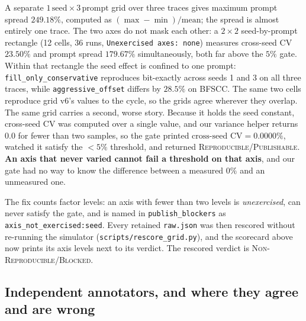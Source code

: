 \documentclass[10pt,twocolumn]{article}
\begin{document}
A separate $1\,\text{seed}\times3\,\text{prompt}$ grid over three traces gives
maximum prompt spread $\mathbf{249.18\%}$, computed as
$(\max-\min)/\text{mean}$; the
spread is almost entirely one trace. The two axes do not mask each other: a
$2\times2$ seed-by-prompt rectangle (12 cells, 36 runs, \texttt{Unexercised axes:
none}) measures cross-seed CV $\mathbf{23.50\%}$ and prompt spread
$\mathbf{179.67\%}$ simultaneously, both far above the $5\%$ gate. Within that
rectangle the seed effect is confined to one prompt: \texttt{fill\_only\_conservative}
reproduces bit-exactly across seeds 1 and 3 on all three traces, while
\texttt{aggressive\_offset} differs by $28.5\%$ on BFSCC. The same two cells
reproduce grid v6's values to the cycle, so the grids agree wherever they overlap.
The same grid carries a second, worse story.
Because it holds the seed constant, cross-seed CV was computed over a single value,
and our variance helper returns $0.0$ for fewer than two samples, so the gate
printed $\text{cross-seed CV}=0.0000\%$, watched it satisfy the $<5\%$ threshold,
and returned \textsc{Reproducible}/\textsc{Publishable}. \textbf{An axis that never
varied cannot fail a threshold on that axis}, and our gate had no way to know the
difference between a measured $0\%$ and an unmeasured one.

The fix counts factor levels: an axis with fewer than two levels is
\emph{unexercised}, can never satisfy the gate, and is named in
\texttt{publish\_blockers} as \texttt{axis\_not\_exercised:seed}. Every retained
\texttt{raw.json} was then rescored without re-running the simulator
(\texttt{scripts/rescore\_grid.py}), and the scorecard above now prints its axis
levels next to its verdict. The rescored verdict is
\textsc{Non-Reproducible}/\textsc{Blocked}.

\subsection{Independent annotators, and where they agree and are wrong}
\label{sec:audit}
\end{document}
